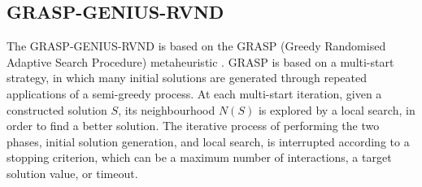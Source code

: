 \documentclass{singlecol-new}
\begin{document}





\subsection{GRASP-GENIUS-RVND}


The GRASP-GENIUS-RVND \citep{daSilva} is based on the GRASP (Greedy Randomised Adaptive Search Procedure) metaheuristic \citep{grasp03}. GRASP is based on a multi-start strategy, in which many initial solutions are generated through repeated applications of a semi-greedy process. At each multi-start iteration, given a constructed solution $S$, its neighbourhood $N(S)$ is explored by a local search, in order to find a better solution. The iterative process of performing the two phases, initial solution generation, and local search, is interrupted according to a stopping criterion, which can be a maximum number of interactions, a target solution value, or timeout.



\end{document}
